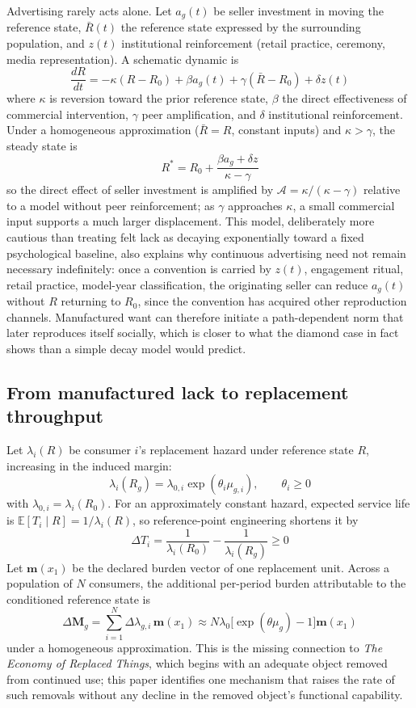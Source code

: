 \documentclass[11pt]{article}
\begin{document}
Advertising rarely acts alone. Let $a_g(t)$ be seller investment in moving the reference state, $\bar{R}(t)$ the reference state expressed by the surrounding population, and $z(t)$ institutional reinforcement (retail practice, ceremony, media representation). A schematic dynamic is
\[
\frac{dR}{dt} = -\kappa(R - R_0) + \beta a_g(t) + \gamma(\bar{R} - R_0) + \delta z(t)
\]
where $\kappa$ is reversion toward the prior reference state, $\beta$ the direct effectiveness of commercial intervention, $\gamma$ peer amplification, and $\delta$ institutional reinforcement. Under a homogeneous approximation ($\bar{R} = R$, constant inputs) and $\kappa > \gamma$, the steady state is
\[
R^{*} = R_0 + \frac{\beta a_g + \delta z}{\kappa - \gamma}
\]
so the direct effect of seller investment is amplified by $\mathcal{A} = \kappa/(\kappa - \gamma)$ relative to a model without peer reinforcement; as $\gamma$ approaches $\kappa$, a small commercial input supports a much larger displacement. This model, deliberately more cautious than treating felt lack as decaying exponentially toward a fixed psychological baseline, also explains why continuous advertising need not remain necessary indefinitely: once a convention is carried by $z(t)$, engagement ritual, retail practice, model-year classification, the originating seller can reduce $a_g(t)$ without $R$ returning to $R_0$, since the convention has acquired other reproduction channels. Manufactured want can therefore initiate a path-dependent norm that later reproduces itself socially, which is closer to what the diamond case in fact shows than a simple decay model would predict.

\subsection{From manufactured lack to replacement throughput}

Let $\lambda_i(R)$ be consumer $i$'s replacement hazard under reference state $R$, increasing in the induced margin:
\[
\lambda_i(R_g) = \lambda_{0,i}\exp(\theta_i \mu_{g,i}), \qquad \theta_i \geq 0
\]
with $\lambda_{0,i} = \lambda_i(R_0)$. For an approximately constant hazard, expected service life is $\mathbb{E}[T_i \mid R] = 1/\lambda_i(R)$, so reference-point engineering shortens it by
\[
\Delta T_i = \frac{1}{\lambda_i(R_0)} - \frac{1}{\lambda_i(R_g)} \geq 0
\]
Let $\mathbf{m}(x_1)$ be the declared burden vector of one replacement unit. Across a population of $N$ consumers, the additional per-period burden attributable to the conditioned reference state is
\[
\Delta\mathbf{M}_g = \sum_{i=1}^{N} \Delta\lambda_{g,i}\, \mathbf{m}(x_1) \approx N\lambda_0\big[\exp(\theta\mu_g) - 1\big]\mathbf{m}(x_1)
\]
under a homogeneous approximation. This is the missing connection to \emph{The Economy of Replaced Things}, which begins with an adequate object removed from continued use; this paper identifies one mechanism that raises the rate of such removals without any decline in the removed object's functional capability.
\end{document}
